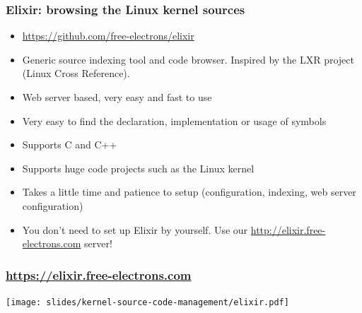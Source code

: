 \begin{frame}
  \frametitle{Elixir: browsing the Linux kernel sources}
  \begin{itemize}
  \item \url{https://github.com/free-electrons/elixir}
  \item Generic source indexing tool and code browser.
        Inspired by the LXR project (Linux Cross Reference).
  \item Web server based, very easy and fast to use
  \item Very easy to find the declaration, implementation or usage
    of symbols
  \item Supports C and C++
  \item Supports huge code projects such as the Linux kernel
  \item Takes a little time and patience to setup (configuration,
    indexing, web server configuration)
  \item You don't need to set up Elixir by yourself. Use our
    \url{http://elixir.free-electrons.com} server!
  \end{itemize}
\end{frame}

\begin{frame}
  \frametitle{\url{https://elixir.free-electrons.com}}
  \begin{center}
    \texttt{[image: slides/kernel-source-code-management/elixir.pdf]}
  \end{center}
\end{frame}
